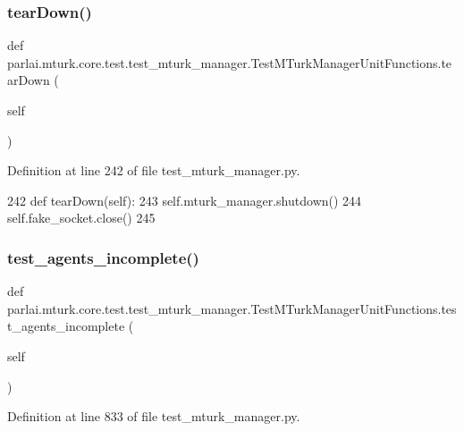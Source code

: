 \subsubsection{\texorpdfstring{tear\+Down()}{tearDown()}}
{\footnotesize\ttfamily def parlai.\+mturk.\+core.\+test.\+test\+\_\+mturk\+\_\+manager.\+Test\+M\+Turk\+Manager\+Unit\+Functions.\+tear\+Down (\begin{DoxyParamCaption}\item[{}]{self }\end{DoxyParamCaption})}



Definition at line 242 of file test\+\_\+mturk\+\_\+manager.\+py.


\begin{DoxyCode}
242     \textcolor{keyword}{def }tearDown(self):
243         self.mturk\_manager.shutdown()
244         self.fake\_socket.close()
245 
\end{DoxyCode}
\mbox{\label{classparlai_1_1mturk_1_1core_1_1test_1_1test__mturk__manager_1_1TestMTurkManagerUnitFunctions_a29a5b916e9a3ac35c05e5b8d87e9b990}} 
\subsubsection{\texorpdfstring{test\+\_\+agents\+\_\+incomplete()}{test\_agents\_incomplete()}}
{\footnotesize\ttfamily def parlai.\+mturk.\+core.\+test.\+test\+\_\+mturk\+\_\+manager.\+Test\+M\+Turk\+Manager\+Unit\+Functions.\+test\+\_\+agents\+\_\+incomplete (\begin{DoxyParamCaption}\item[{}]{self }\end{DoxyParamCaption})}



Definition at line 833 of file test\+\_\+mturk\+\_\+manager.\+py.


